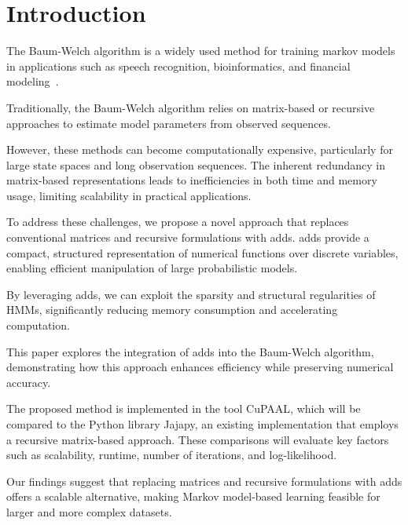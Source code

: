 
\section{Introduction}\label{sec:introduction}
The Baum-Welch algorithm is a widely used method for training markov models in applications such as speech recognition, bioinformatics, and financial modeling~\cite{chavan2013overview,ciocchetta2009bio,mamon2007hidden}.

Traditionally, the Baum-Welch algorithm relies on matrix-based or recursive approaches to estimate model parameters from observed sequences.

However, these methods can become computationally expensive, particularly for large state spaces and long observation sequences.
The inherent redundancy in matrix-based representations leads to inefficiencies in both time and memory usage, limiting scalability in practical applications.

To address these challenges, we propose a novel approach that replaces conventional matrices and recursive formulations with \glspl{add}.
\glspl{add} provide a compact, structured representation of numerical functions over discrete variables, enabling efficient manipulation of large probabilistic models.

By leveraging \glspl{add}, we can exploit the sparsity and structural regularities of HMMs, significantly reducing memory consumption and accelerating computation.

This paper explores the integration of \glspl{add} into the Baum-Welch algorithm, demonstrating how this approach enhances efficiency while preserving numerical accuracy.

The proposed method is implemented in the tool CuPAAL, which will be compared to the Python library Jajapy, an existing implementation that employs a recursive matrix-based approach. These comparisons will evaluate key factors such as scalability, runtime, number of iterations, and log-likelihood.

Our findings suggest that replacing matrices and recursive formulations with \glspl{add} offers a scalable alternative, making Markov model-based learning feasible for larger and more complex datasets.